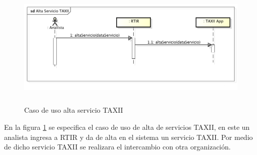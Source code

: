 \bigskip

\begin{figure}[ht!]
	\centering
	\includegraphics[width=5.7638in,height=2.3217in]{Analisis22-img/Analisis22-img023.png} 
	\caption{Caso de uso alta servicio TAXII}
	\label{fig.altaserviciotaxii}
\end{figure}
{
	En la figura \ref{fig.altaserviciotaxii} se especifica el caso de uso de alta de servicios TAXII, en este un analista ingresa a RTIR y da de alta
	en el sistema un servicio TAXII. Por medio de dicho servicio TAXII se realizara el intercambio con otra organización.}


